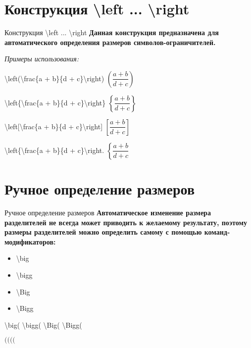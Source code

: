 \documentclass[aspectratio=169]{beamer}
\begin{document}
\section{Конструкция \textbackslash left ... \textbackslash right}
\begin{frame}{Конструкция \textbackslash left ... \textbackslash right}
    \textbf{Данная конструкция предназначена для автоматического определения размеров символов-ограничителей.}

    \small
    \textit{Примеры использования:}

    \textbackslash left(\textbackslash frac\{a + b\}\{d + c\}\textbackslash right) $\left(\dfrac{a + b}{d + c}\right)$

    \textbackslash left\{\textbackslash frac\{a + b\}\{d + c\}\textbackslash right\} $\left\{\dfrac{a + b}{d + c}\right\}$

    \textbackslash left[\textbackslash frac\{a + b\}\{d + c\}\textbackslash right] $\left[\dfrac{a + b}{d + c}\right]$

    \textbackslash left\{\textbackslash frac\{a + b\}\{d + c\}\textbackslash right. $\left\{\dfrac{a + b}{d + c}\right.$
\end{frame}

\section{Ручное определение размеров}
\begin{frame}{Ручное определение размеров}
    \textbf{Автоматическое изменение размера разделителей не всегда может приводить к желаемому результату, поэтому размеры разделителей можно определить самому с помощью команд-модификаторов:}
    \begin{minipage}{0.45\textwidth}
        \begin{itemize}
            \item \textbackslash big
            \item \textbackslash bigg
            \item \textbackslash Big
            \item \textbackslash Bigg
        \end{itemize}
    \end{minipage}
    \begin{minipage}{0.45\textwidth}
        \centering
        \textbackslash big( \textbackslash bigg( \textbackslash Big( \textbackslash Bigg(

        $\big( \bigg( \Big( \Bigg($
    \end{minipage}
\end{frame}
\end{document}
